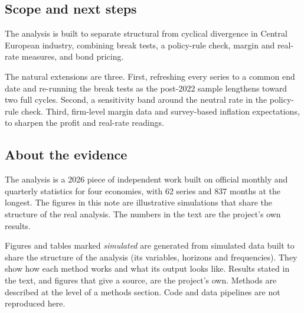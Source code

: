 \documentclass[
  british,
  a4paper,
]{article}
\begin{document}
\subsection{Scope and next steps}\label{scope-and-next-steps}

The analysis is built to separate structural from cyclical divergence in
Central European industry, combining break tests, a policy-rule check,
margin and real-rate measures, and bond pricing.

The natural extensions are three. First, refreshing every series to a
common end date and re-running the break tests as the post-2022 sample
lengthens toward two full cycles. Second, a sensitivity band around the
neutral rate in the policy-rule check. Third, firm-level margin data and
survey-based inflation expectations, to sharpen the profit and real-rate
readings.

\subsection{About the evidence}\label{about-the-evidence}

The analysis is a 2026 piece of independent work built on official
monthly and quarterly statistics for four economies, with 62 series and
837 months at the longest. The figures in this note are illustrative
simulations that share the structure of the real analysis. The numbers
in the text are the project's own results.

Figures and tables marked \emph{simulated} are generated from simulated
data built to share the structure of the analysis (its variables,
horizons and frequencies). They show how each method works and what its
output looks like. Results stated in the text, and figures that give a
source, are the project's own. Methods are described at the level of a
methods section. Code and data pipelines are not reproduced here.
\end{document}
